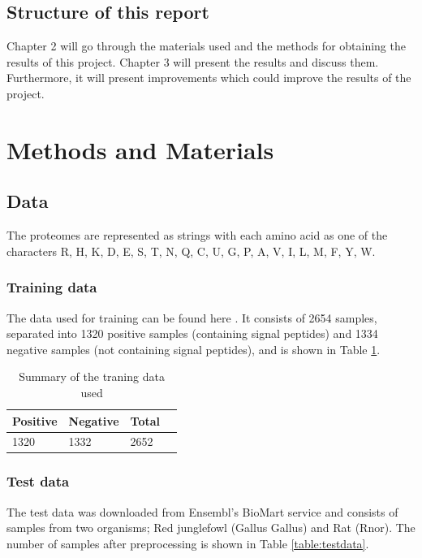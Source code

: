 \documentclass[10pt]{article}
\begin{document}
\subsection{Structure of this report}
Chapter 2 will go through the materials used and the methods for obtaining the results of this project.
Chapter 3 will present the results and discuss them.
Furthermore, it will present improvements which could improve the results of the project.

\section{Methods and Materials}

\subsection{Data}
The proteomes are represented as strings with each amino acid as one of the characters R, H, K, D, E, S, T, N, Q, C, U, G, P, A, V, I, L, M, F, Y, W.
\subsubsection{Training data}
The data used for training can be found here \cite{website:project-description}.
It consists of 2654 samples, separated into 1320 positive samples (containing signal peptides) and 1334 negative
samples (not containing signal peptides), and is shown in Table \ref{table:trainingdata}.

\begin{table}[h]
\begin{center}
\begin{tabular}{| l | l | l | l |}
\hline
Positive & Negative & Total\\ \hline
1320 & 1332 & 2652\\ \hline
\end{tabular}
\end{center}
\caption{Summary of the traning data used}
\label{table:trainingdata}
\end{table}

\subsubsection{Test data}
The test data was downloaded from Ensembl's BioMart service \cite{website:ensembl}
and consists of samples from two organisms; Red junglefowl (Gallus Gallus) and Rat (Rnor). The number of samples
after preprocessing is shown in Table \ref{table:testdata}.
\end{document}
